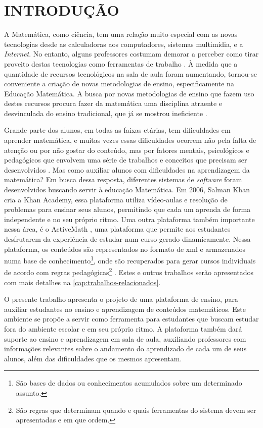 \chapter{INTRODUÇÃO}
\label{cap:introducao}

A Matemática, como ciência, tem uma relação muito especial com as novas tecnologias desde as calculadoras aos computadores, sistemas 
multim\'idia, e a \textit{Internet}. No entanto, alguns professores costumam demorar a perceber como tirar proveito destas tecnologias como 
ferramentas de trabalho \cite{da1997ensino}. \`A medida que a quantidade de recursos tecnológicos na sala de aula foram aumentando, 
tornou-se conveniente a criação de novas metodologias de ensino, especificamente na Educação Matemática. A busca por novas 
metodologias de ensino que fazem uso destes recursos procura fazer da matemática uma disciplina atraente e desvinculada do ensino 
tradicional, que já se mostrou ineficiente \cite{silva2009ambiente}.

Grande parte dos alunos, em todas as faixas etárias, tem dificuldades em aprender matemática, e muitas vezes essas dificuldades ocorrem não pela falta de atenção ou por não gostar do conteúdo, mas por fatores mentais, psicológicos e pedag\'ogicos que envolvem uma série de trabalhos e conceitos que precisam ser desenvolvidos \cite{de2006dificuldades}. Mas como auxiliar alunos com dificuldades na aprendizagem da matemática? Em busca dessa resposta, diferentes sistemas de \textit{software} foram desenvolvidos buscando servir \`a  educação Matem\'atica. Em 2006, Salman Khan cria a Khan Academy, essa plataforma utiliza vídeo-aulas e resolução de problemas para ensinar seus alunos, permitindo que cada um aprenda de forma independente e no seu pr\'oprio ritmo. Uma outra plataforma também  importante nessa área, \'e o ActiveMath \cite{melis2001activemath}, uma plataforma que permite aos estudantes desfrutarem da experiência de estudar num curso gerado dinamicamente. Nessa plataforma, os conte\'udos s\~ao representados no formato de \gls{xml} \cite{bray1998extensible} e armazenados numa base de conhecimento\footnote{São bases de dados ou conhecimentos acumulados sobre um determinado assunto.}, onde s\~ao recuperados para gerar cursos individuais de acordo com regras 
pedagógicas\footnote{S\~ao regras que determinam quando e quais ferramentas do sistema devem ser apresentadas e em que ordem.} 
\cite{melis2004activemath}. Estes e outros trabalhos serão apresentados com mais detalhes na \autoref{cap:trabalhos-relacionados}.

O presente trabalho apresenta o projeto de uma plataforma de ensino, para auxiliar 
estudantes no ensino e aprendizagem de conteúdos matemáticos. Este ambiente se propõe a servir como ferramenta para estudantes que buscam 
estudar fora do ambiente escolar e em seu próprio ritmo. A plataforma também dará suporte ao ensino e aprendizagem em sala de aula, 
auxiliando professores com informações relevantes sobre o andamento do aprendizado de cada um de seus alunos, além das dificuldades que os 
mesmos apresentam.

